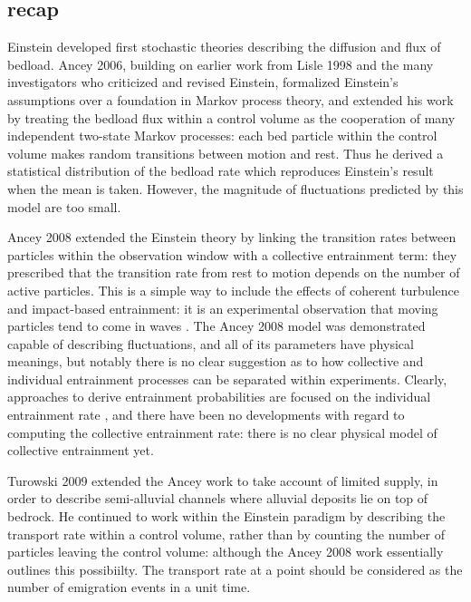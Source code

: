 \subsection{recap} 
Einstein developed first stochastic theories describing the diffusion and flux of bedload. 
Ancey 2006, building on earlier work from Lisle 1998 and the many investigators who criticized and revised Einstein, formalized Einstein's assumptions over a foundation in Markov process theory, and extended his work by treating the bedload flux within a control volume as the cooperation of many independent two-state Markov processes: each bed particle within the control volume makes random transitions between motion and rest. 
Thus he derived a statistical distribution of the bedload rate which reproduces Einstein's result when the mean is taken. 
However, the magnitude of fluctuations predicted by this model are too small. 

Ancey 2008 extended the Einstein theory by linking the transition rates between particles within the observation window with a collective entrainment term: they prescribed that the transition rate from rest to motion depends on the number of active particles. 
This is a simple way to include the effects of coherent turbulence and impact-based entrainment: it is an experimental observation that moving particles tend to come in waves \citep{Drake1988}. 
The Ancey 2008 model was demonstrated capable of describing fluctuations, and all of its parameters have physical meanings, but notably there is no clear suggestion as to how collective and individual entrainment processes can be separated within experiments. 
Clearly, approaches to derive entrainment probabilities are focused on the individual entrainment rate \citep{Dey2018}, and there have been no developments with regard to computing the collective entrainment rate: there is no clear physical model of collective entrainment yet. 

Turowski 2009 extended the Ancey work to take account of limited supply, in order to describe semi-alluvial channels where alluvial deposits lie on top of bedrock. 
He continued to work within the Einstein paradigm by describing the transport rate within a control volume, rather than by counting the number of particles leaving the control volume: although the Ancey 2008 work essentially outlines this possibiilty. The transport rate at a point should be considered as the number of emigration events in a unit time. 

